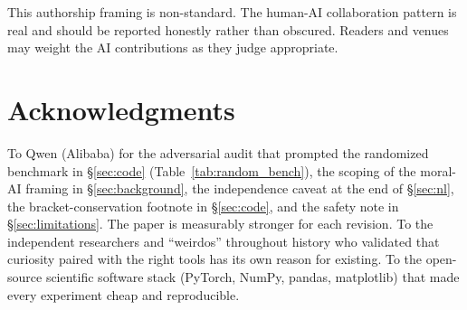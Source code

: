 \documentclass[11pt,a4paper]{article}
\begin{document}
This authorship framing is non-standard. The human-AI collaboration pattern is real and should be reported honestly rather than obscured. Readers and venues may weight the AI contributions as they judge appropriate.

\section{Acknowledgments}\label{sec:ack}

To Qwen (Alibaba) for the adversarial audit that prompted the randomized benchmark in §\ref{sec:code} (Table~\ref{tab:random_bench}), the scoping of the moral-AI framing in §\ref{sec:background}, the independence caveat at the end of §\ref{sec:nl}, the bracket-conservation footnote in §\ref{sec:code}, and the safety note in §\ref{sec:limitations}. The paper is measurably stronger for each revision. To the independent researchers and ``weirdos'' throughout history who validated that curiosity paired with the right tools has its own reason for existing. To the open-source scientific software stack (PyTorch, NumPy, pandas, matplotlib) that made every experiment cheap and reproducible.
\end{document}
